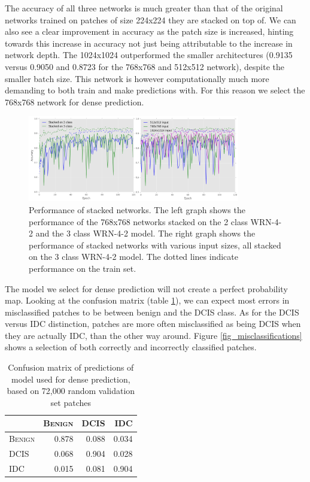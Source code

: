 \documentclass[journal]{IEEEtran}
\begin{document}



The accuracy of all three networks is much greater than that of the original networks trained on patches of size 224x224 they are stacked on top of. We can also see a clear improvement in accuracy as the patch size is 
increased, hinting towards this increase in accuracy not just being attributable to the increase in network depth. The 1024x1024 outperformed the smaller architectures (0.9135 versus 0.9050 and 0.8723 for the 768x768 and 512x512 network), despite the smaller batch size. This network is however computationally much more demanding to both train and make predictions with. For this reason we select the 768x768 network for dense prediction.


\begin{figure}[!t]
\centering{}
\hspace{-0.45cm}\includegraphics[width=3.65in]{768_performance_dual}
\vspace{-0.35cm}\caption{Performance of stacked networks. The left graph shows the performance of the 768x768 networks stacked on the 2 class WRN-4-2 and the 3 class WRN-4-2 model. The right graph shows the performance of stacked networks with various input sizes, all stacked on the 3 class WRN-4-2 model. The dotted lines indicate performance on the train set.}
\label{fig_stack}
\end{figure}


\bigskip

The model we select for dense prediction will not create a perfect probability map. Looking at the confusion matrix (table \ref{table_confusion_768}), we can expect most errors in misclassified patches to be between benign and the DCIS class. As for the DCIS versus IDC distinction, patches are more often misclassified as being DCIS when they are actually IDC, than the other way around. Figure \ref{fig_misclassifications} shows a selection of both correctly and incorrectly classified patches.

\begin{table}[h]
\renewcommand{\arraystretch}{1.21}
\caption{Confusion matrix of predictions of model used for dense prediction, based on 72,000 random validation set patches }
\label{table_confusion_768}
\centering
\begin{tabular}{|l|rrr|}
\hline
\textsc{}&\textsc{Benign}&\textsc{DCIS}&\textsc{IDC}\\
\hline
\textsc{Benign}&0.878&0.088&0.034\\
\textsc{DCIS}&0.068& 0.904&0.028\\
\textsc{IDC}&0.015& 0.081&0.904\\
\hline

\end{tabular}
\end{table}
\end{document}
